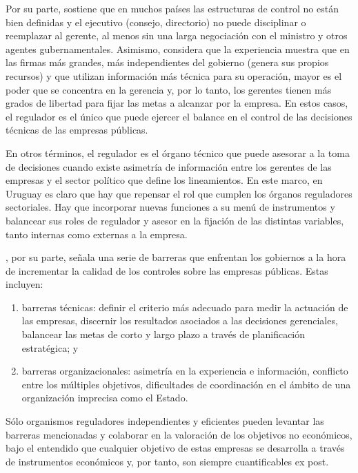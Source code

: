 \documentclass[
  12pt,
  spanish,
]{book}
\providecommand{\tightlist}{%
  \setlength{\itemsep}{0pt}\setlength{\parskip}{0pt}}
\begin{document}
Por su parte, \citet{Aharoni1982} sostiene que en muchos países las estructuras de control no están bien definidas y el ejecutivo (consejo, directorio) no puede disciplinar o reemplazar al gerente, al menos sin una larga negociación con el ministro y otros agentes gubernamentales. Asimismo, considera que la experiencia muestra que en las firmas más grandes, más independientes del gobierno (genera sus propios recursos) y que utilizan información más técnica para su operación, mayor es el poder que se concentra en la gerencia y, por lo tanto, los gerentes tienen más grados de libertad para fijar las metas a alcanzar por la empresa. En estos casos, el regulador es el único que puede ejercer el balance en el control de las decisiones técnicas de las empresas públicas.

En otros términos, el regulador es el órgano técnico que puede asesorar a la toma de decisiones cuando existe asimetría de información entre los gerentes de las empresas y el sector político que define los lineamientos. En este marco, en Uruguay es claro que hay que repensar el rol que cumplen los órganos reguladores sectoriales. Hay que incorporar nuevas funciones a su menú de instrumentos y balancear sus roles de regulador y asesor en la fijación de las distintas variables, tanto internas como externas a la empresa.

\citet{Ramamurti1991}, por su parte, señala una serie de barreras que enfrentan los gobiernos a la hora de incrementar la calidad de los controles sobre las empresas públicas. Estas incluyen:

\begin{enumerate}
\def\labelenumi{\arabic{enumi}.}
\tightlist
\item
  barreras técnicas: definir el criterio más adecuado para medir la actuación de las empresas, discernir los resultados asociados a las decisiones gerenciales, balancear las metas de corto y largo plazo a través de planificación estratégica; y
\item
  barreras organizacionales: asimetría en la experiencia e información, conflicto entre los múltiples objetivos, dificultades de coordinación en el ámbito de una organización imprecisa como el Estado.
\end{enumerate}

Sólo organismos reguladores independientes y eficientes pueden levantar las barreras mencionadas y colaborar en la valoración de los objetivos no económicos, bajo el entendido que cualquier objetivo de estas empresas se desarrolla a través de instrumentos económicos y, por tanto, son siempre cuantificables ex post.
\end{document}
